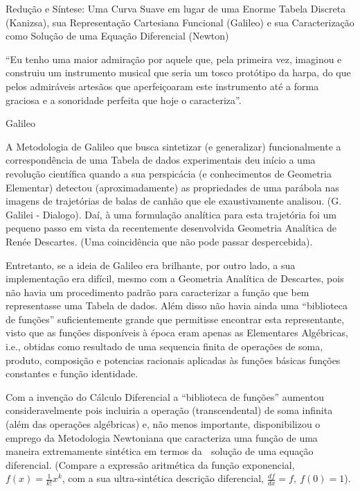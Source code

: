 Redução e Síntese: Uma Curva Suave em lugar de uma Enorme Tabela Discreta (Kanizsa), sua Representação Cartesiana Funcional (Galileo) e sua Caracterização como Solução de uma Equação Diferencial (Newton) 

\begin{citacao}
    ``Eu tenho uma maior admiração por aquele que, pela primeira vez, imaginou e construiu um instrumento musical que seria um tosco protótipo da harpa, do que pelos admiráveis artesãos que aperfeiçoaram este instrumento até a forma graciosa e a sonoridade perfeita que hoje o caracteriza''.

Galileo 
\end{citacao}

    A Metodologia de Galileo que busca sintetizar (e generalizar) funcionalmente a correspondência de uma Tabela de dados experimentais deu início a uma revolução científica quando a sua perspicácia (e conhecimentos de Geometria Elementar) detectou (aproximadamente) as propriedades de uma parábola nas imagens de trajetórias de balas de canhão que ele exaustivamente analisou. (G. Galilei - Dialogo). Daí, à uma formulação analítica para esta trajetória foi um pequeno passo em vista da recentemente desenvolvida Geometria Analítica de Renée Descartes. (Uma coincidência que não pode passar despercebida).

    Entretanto, se a ideia de Galileo era brilhante, por outro lado, a sua implementação era difícil, mesmo com a Geometria Analítica de Descartes, pois não havia um procedimento padrão para caracterizar a função que bem representasse uma Tabela de dados. Além disso não havia ainda uma ``biblioteca de funções'' suficientemente grande que permitisse encontrar esta representante, visto que as funções disponíveis à época eram apenas as Elementares Algébricas, i.e., obtidas como resultado de uma sequencia finita de operações de soma, produto, composição e potencias racionais aplicadas às funções básicas {funções constantes e função identidade}.

    Com a invenção do Cálculo Diferencial a ``biblioteca de funções'' aumentou consideravelmente pois incluiria a operação (transcendental) de soma infinita (além das operações algébricas) e, não menos importante, disponibilizou o emprego da Metodologia Newtoniana que caracteriza uma função de uma maneira extremamente sintética em termos da  solução de uma equação diferencial. (Compare a expressão aritmética da função exponencial, \(f(x) = \frac{1}{k!} x^k\), com a sua ultra-sintética descrição diferencial, \(\frac{df}{dx} = f,\ f(0) = 1\)).

